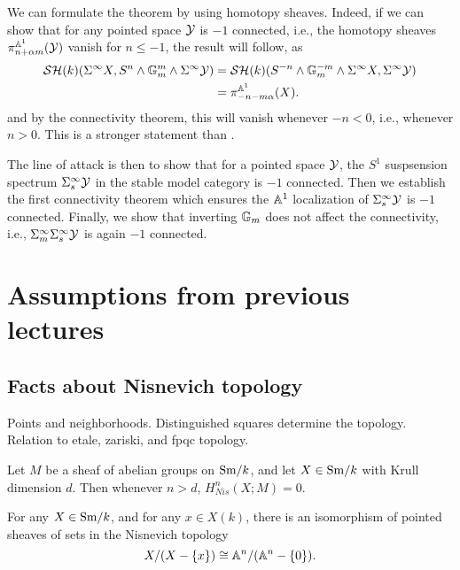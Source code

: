 \documentclass{amsart}%
\begin{document}
\begin{remark}
  We can formulate the theorem by using homotopy sheaves. Indeed, if
  we can show that for any pointed space $\mathcal{Y}$ is $-1$ connected,
  i.e., the homotopy sheaves $\pi^{\mathbb{A}^1}_{n+\alpha m}(\mathcal{Y})$ vanish
  for $n\leq -1$, the result will follow, as
  \begin{align*}
    \mathcal{SH}(k)(\Sigma^{\infty}X, S^n\wedge \mathbb{G}_m^m \wedge \Sigma^{\infty} \mathcal{Y}) 
    & = \mathcal{SH}(k)(S^{-n}\wedge \mathbb{G}_m^{-m} \wedge \Sigma^{\infty}X, \Sigma^{\infty} \mathcal{Y})\\
    & = \pi_{-n-m\alpha}^{\mathbb{A}^1}(X).
  \end{align*}
  and by the connectivity theorem, this will vanish whenever $-n < 0$,
  i.e., whenever $n > 0$. This is a stronger statement than
  \cite[theorem 4.14]{Voev98}. 

  The line of attack is then to show that for a pointed space $\mathcal{Y}$,
  the $S^1$ suspsension spectrum $\Sigma^{\infty}_s \mathcal{Y}$ in the
  stable model category is $-1$ connected. Then we establish the
  first connectivity theorem which ensures the $\mathbb{A}^1$ localization
  of $\Sigma^{\infty}_s\mathcal{Y}$ is $-1$ connected. Finally, we show that
  inverting $\mathbb{G}_m$ does not affect the connectivity, i.e.,
  $\Sigma^{\infty}_{m}\Sigma^{\infty}_s \mathcal{Y}$ is again $-1$ connected. 
\end{remark}

\section{Assumptions from previous lectures}

\subsection{Facts about Nisnevich topology}

Points and neighborhoods. Distinguished squares determine the
topology. Relation to etale, zariski, and fpqc topology. 

\begin{proposition}\cite[2.4.1]{Mor04}
  Let $M$ be a sheaf of abelian groups on $\mathrm{Sm}/k$, and let
  $X\in \mathrm{Sm}/k$ with Krull dimension $d$. Then whenever $n > d$,
  $H^n_{Nis}(X;M) = 0$.
\end{proposition}

\begin{proposition}\cite[2.4.1]{Mor04}
  For any $X \in \mathrm{Sm}/k$, and for any $x \in X(k)$, there is an
  isomorphism of pointed sheaves of sets in the Nisnevich topology
  \begin{equation*}
    X/(X-\{x\}) \cong \mathbb{A}^n / (\mathbb{A}^n - \{0\}).
  \end{equation*}
\end{proposition}
\end{document}
